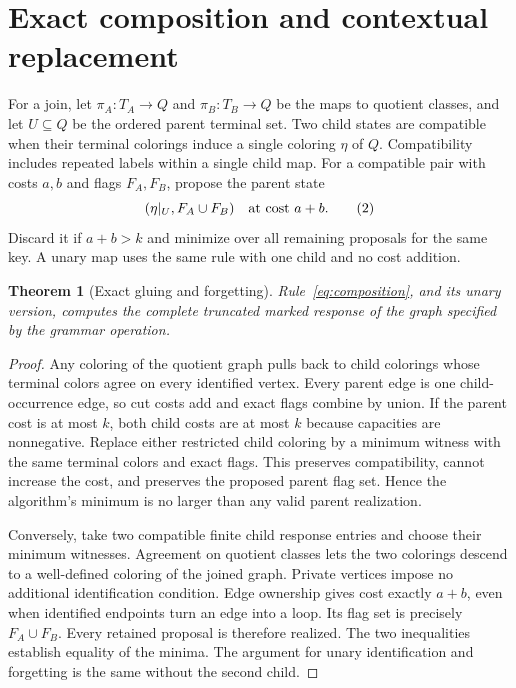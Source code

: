 \documentclass[11pt,a4paper]{article}
\newtheorem{theorem}{Theorem}[section]
\theoremstyle{definition}
\theoremstyle{remark}
\begin{document}
\section{Exact composition and contextual replacement}
\label{sec:composition}
For a join, let $\pi_A:T_A\to Q$ and $\pi_B:T_B\to Q$ be the maps to quotient classes, and let $U\subseteq Q$ be the ordered parent terminal set. Two child states are compatible when their terminal colorings induce a single coloring $\eta$ of $Q$. Compatibility includes repeated labels within a single child map. For a compatible pair with costs $a,b$ and flags $F_A,F_B$, propose the parent state
\[
 (\eta|_U,F_A\cup F_B)\quad\hbox{at cost }a+b.
 \tag{2}\label{eq:composition}
\]
Discard it if $a+b>k$ and minimize over all remaining proposals for the same key. A unary map uses the same rule with one child and no cost addition.

\begin{theorem}[Exact gluing and forgetting]
\label{thm:compose}
Rule~\eqref{eq:composition}, and its unary version, computes the complete truncated marked response of the graph specified by the grammar operation.
\end{theorem}
\begin{proof}
Any coloring of the quotient graph pulls back to child colorings whose terminal colors agree on every identified vertex. Every parent edge is one child-occurrence edge, so cut costs add and exact flags combine by union. If the parent cost is at most $k$, both child costs are at most $k$ because capacities are nonnegative. Replace either restricted child coloring by a minimum witness with the same terminal colors and exact flags. This preserves compatibility, cannot increase the cost, and preserves the proposed parent flag set. Hence the algorithm's minimum is no larger than any valid parent realization.

Conversely, take two compatible finite child response entries and choose their minimum witnesses. Agreement on quotient classes lets the two colorings descend to a well-defined coloring of the joined graph. Private vertices impose no additional identification condition. Edge ownership gives cost exactly $a+b$, even when identified endpoints turn an edge into a loop. Its flag set is precisely $F_A\cup F_B$. Every retained proposal is therefore realized. The two inequalities establish equality of the minima. The argument for unary identification and forgetting is the same without the second child.
\end{proof}
\end{document}
